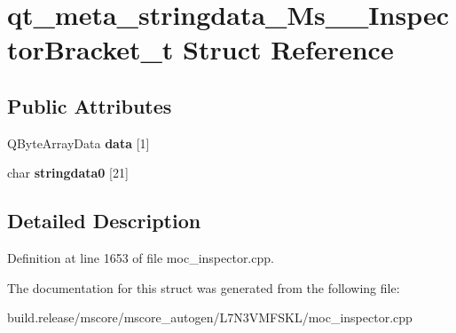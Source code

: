 \hypertarget{structqt__meta__stringdata___ms_____inspector_bracket__t}{}\section{qt\+\_\+meta\+\_\+stringdata\+\_\+\+Ms\+\_\+\+\_\+\+Inspector\+Bracket\+\_\+t Struct Reference}
\label{structqt__meta__stringdata___ms_____inspector_bracket__t}
\subsection*{Public Attributes}
\begin{DoxyCompactItemize}
\item 
\mbox{\label{structqt__meta__stringdata___ms_____inspector_bracket__t_af5313de4442be3b8016f5923d05f0fe6}} 
Q\+Byte\+Array\+Data {\bfseries data} \mbox{[}1\mbox{]}
\item 
\mbox{\label{structqt__meta__stringdata___ms_____inspector_bracket__t_a904d0aeb5d911a0e3a12a26e2f0dcd7c}} 
char {\bfseries stringdata0} \mbox{[}21\mbox{]}
\end{DoxyCompactItemize}


\subsection{Detailed Description}


Definition at line 1653 of file moc\+\_\+inspector.\+cpp.



The documentation for this struct was generated from the following file\+:\begin{DoxyCompactItemize}
\item 
build.\+release/mscore/mscore\+\_\+autogen/\+L7\+N3\+V\+M\+F\+S\+K\+L/moc\+\_\+inspector.\+cpp\end{DoxyCompactItemize}
